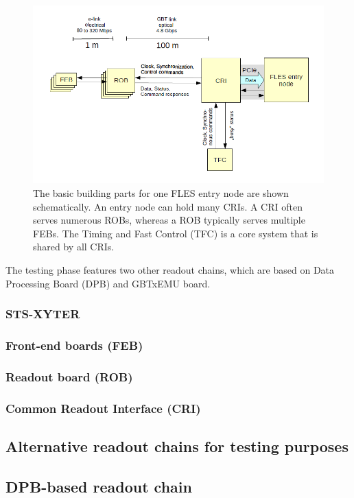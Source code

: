 \begin{figure}[!h]
\centering
\includegraphics[width=0.8\columnwidth]{Chapter2/images/CRI_DAQ.png}
\caption{The basic building parts for one \gls{FLES} entry node are shown schematically. An entry node can hold many \glspl{CRI}. A \gls{CRI} often serves numerous \glspl{ROB}, whereas a \gls{ROB} typically serves multiple \glspl{FEB}. The Timing and Fast Control (\gls{TFC}) is a core system that is shared by all \glspl{CRI}.}
\label{fig_daq_cri}
\end{figure}

The testing phase features two other readout chains, which are based on Data Processing Board (\gls{DPB}) and GBTxEMU board. 
\subsubsection{STS-XYTER}

\subsubsection{Front-end boards (FEB)}

\subsubsection{Readout board (ROB)}

\subsubsection{Common Readout Interface (CRI)}
\subsection{Alternative readout chains for testing purposes}

\subsection{DPB-based readout chain}

